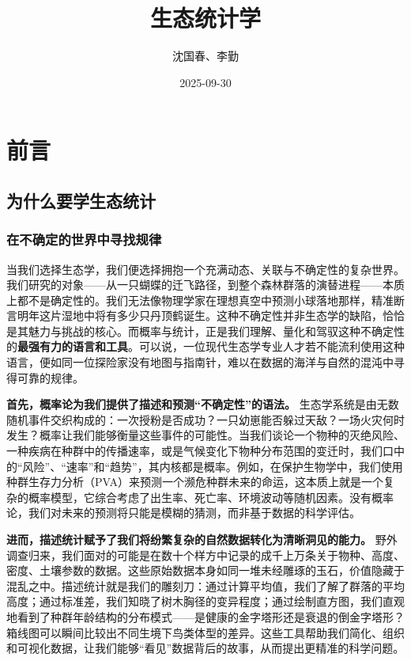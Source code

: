 \documentclass[
  twoside]{book}
\title{生态统计学}
\author{沈国春、李勤}
\date{2025-09-30}
\begin{document}
\maketitle

{
\setcounter{tocdepth}{1}
\tableofcontents
}
\listoffigures
\listoftables
{}
\hypertarget{ux524dux8a00}{%
\chapter*{前言}\label{ux524dux8a00}}

\hypertarget{ux4e3aux4ec0ux4e48ux8981ux5b66ux751fux6001ux7edfux8ba1}{%
\section{为什么要学生态统计}\label{ux4e3aux4ec0ux4e48ux8981ux5b66ux751fux6001ux7edfux8ba1}}

\hypertarget{ux5728ux4e0dux786eux5b9aux7684ux4e16ux754cux4e2dux5bfbux627eux89c4ux5f8b}{%
\subsection{在不确定的世界中寻找规律}\label{ux5728ux4e0dux786eux5b9aux7684ux4e16ux754cux4e2dux5bfbux627eux89c4ux5f8b}}

当我们选择生态学，我们便选择拥抱一个充满动态、关联与不确定性的复杂世界。我们研究的对象------从一只蝴蝶的迁飞路径，到整个森林群落的演替进程------本质上都不是确定性的。我们无法像物理学家在理想真空中预测小球落地那样，精准断言明年这片湿地中将有多少只丹顶鹤诞生。这种不确定性并非生态学的缺陷，恰恰是其魅力与挑战的核心。而概率与统计，正是我们理解、量化和驾驭这种不确定性的\textbf{最强有力的语言和工具}。可以说，一位现代生态学专业人才若不能流利使用这种语言，便如同一位探险家没有地图与指南针，难以在数据的海洋与自然的混沌中寻得可靠的规律。

\textbf{首先，概率论为我们提供了描述和预测``不确定性''的语法。} 生态学系统是由无数随机事件交织构成的：一次授粉是否成功？一只幼崽能否躲过天敌？一场火灾何时发生？概率让我们能够衡量这些事件的可能性。当我们谈论一个物种的灭绝风险、一种疾病在种群中的传播速率，或是气候变化下物种分布范围的变迁时，我们口中的``风险''、``速率''和``趋势''，其内核都是概率。例如，在保护生物学中，我们使用种群生存力分析（PVA）来预测一个濒危种群未来的命运，这本质上就是一个复杂的概率模型，它综合考虑了出生率、死亡率、环境波动等随机因素。没有概率论，我们对未来的预测将只能是模糊的猜测，而非基于数据的科学评估。

\textbf{进而，描述统计赋予了我们将纷繁复杂的自然数据转化为清晰洞见的能力。} 野外调查归来，我们面对的可能是在数十个样方中记录的成千上万条关于物种、高度、密度、土壤参数的数据。这些原始数据本身如同一堆未经雕琢的玉石，价值隐藏于混乱之中。描述统计就是我们的雕刻刀：通过计算平均值，我们了解了群落的平均高度；通过标准差，我们知晓了树木胸径的变异程度；通过绘制直方图，我们直观地看到了种群年龄结构的分布模式------是健康的金字塔形还是衰退的倒金字塔形？箱线图可以瞬间比较出不同生境下鸟类体型的差异。这些工具帮助我们简化、组织和可视化数据，让我们能够``看见''数据背后的故事，从而提出更精准的科学问题。
\end{document}
